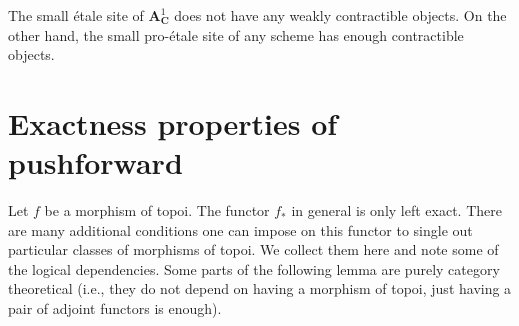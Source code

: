 The small \'etale site of $\mathbf{A}^1_\mathbf{C}$ does not have
any weakly contractible objects. On the other hand, the small
pro-\'etale site of any scheme has enough contractible objects.

\section{Exactness properties of pushforward}
\label{sites-section-pushforward}
Let $f$ be a morphism of topoi. The functor $f_*$ in general is only
left exact. There are many additional conditions one can impose on this
functor to single out particular classes of morphisms of topoi.
We collect them here and note some of the logical dependencies.
Some parts of the following lemma are purely category theoretical (i.e.,
they do not depend on having a morphism of topoi, just having a pair
of adjoint functors is enough).

